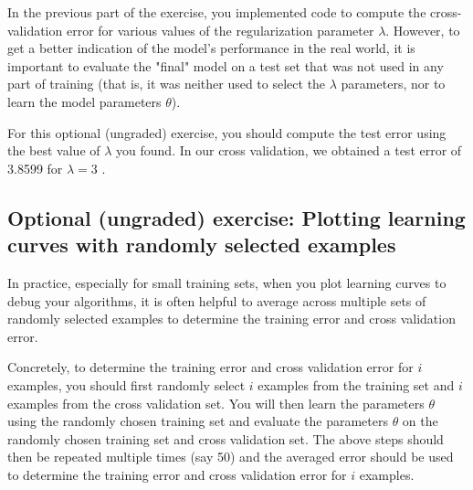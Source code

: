 \documentclass[12pt]{article}
\begin{document}
In the previous part of the exercise, you implemented code to compute the cross-validation error for various values of the regularization parameter $\lambda$. However, to get a better indication of the model’s performance in the real world, it is important to evaluate the "final" model on a test set that was not used in any part of training (that is, it was neither used to select the $\lambda$ parameters, nor to learn the model parameters $\theta$).

For this optional (ungraded) exercise, you should compute the test error
using the best value of $\lambda$ you found. In our cross validation, we obtained a
test error of 3.8599 for $\lambda= 3$ .

\subsection{Optional (ungraded) exercise: Plotting learning curves with randomly selected examples}

In practice, especially for small training sets, when you plot learning curves to debug your algorithms, it is often helpful to average across multiple sets of randomly selected examples to determine the training error and cross validation error.

Concretely, to determine the training error and cross validation error for $i$ examples, you should first randomly select $i$ examples from the training set and $i$ examples from the cross validation set. You will then learn the parameters $\theta$ using the randomly chosen training set and evaluate the parameters $\theta$ on the randomly chosen training set and cross validation set. The above steps should then be repeated multiple times (say 50) and the averaged error should be used to determine the training error and cross validation error for $i$ examples.
\end{document}
